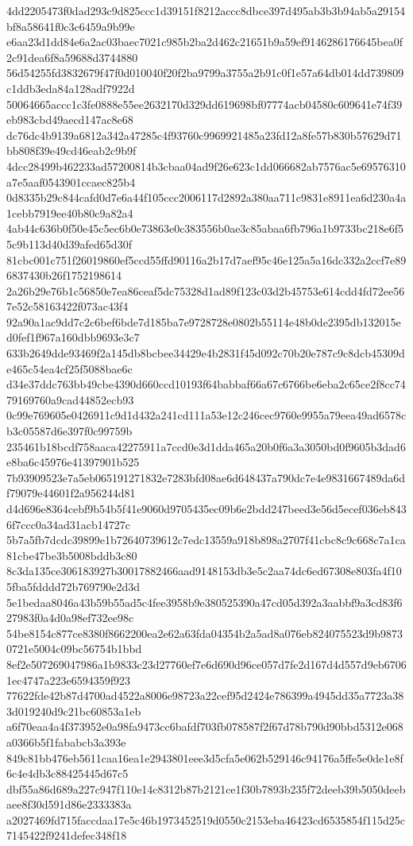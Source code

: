 {4dd2205473f0dad293c9d825ccc1d39151f8212accc8dbce397d495ab3b3b94ab5a29154bf8a58641f0c3c6459a9b99e
e6aa23d1dd84e6a2ac03baec7021c985b2ba2d462c21651b9a59ef9146286176645bea0f2c91dea6f8a59688d3744880
56d54255fd3832679f47f0d010040f20f2ba9799a3755a2b91c0f1e57a64db014dd739809c1ddb3eda84a128adf7922d
50064665accc1c3fe0888e55ee2632170d329dd619698bf07774acb04580c609641e74f39eb983cbd49aecd147ac8e68
dc76dc4b9139a6812a342a47285c4f93760c9969921485a23fd12a8fe57b830b57629d71bb808f39e49cd46eab2c9b9f
4dcc28499b462233ad57200814b3cbaa04ad9f26e623c1dd066682ab7576ac5e69576310a7e5aaf0543901ccaec825b4
0d8335b29c844cafd0d7e6a44f105ccc2006117d2892a380aa711c9831e8911ea6d230a4a1cebb7919ee40b80c9a82a4
4ab44c636b0f50e45c5ec6b0e73863e0c383556b0ae3c85abaa6fb796a1b9733bc218e6f55c9b113d40d39afed65d30f
81cbc001c751f26019860ef5ccd55ffd90116a2b17d7aef95c46e125a5a16dc332a2ccf7e896837430b26f1752198614
2a26b29e76b1c56850e7ea86ceaf5dc75328d1ad89f123c03d2b45753e614cdd4fd72ee567e52c58163422f073ac43f4
92a90a1ac9dd7c2c6bef6bde7d185ba7e9728728e0802b55114e48b0de2395db132015ed0fef1f967a160dbb9693e3c7
633b2649dde93469f2a145db8bcbee34429e4b2831f45d092c70b20e787c9c8dcb45309de465c54ea4cf25f5088bae6c
d34e37ddc763bb49cbe4390d660ccd10193f64babbaf66a67c6766be6eba2c65ce2f8cc7479169760a9cad44852ecb93
0c99e769605e0426911c9d1d432a241cd111a53e12c246cec9760e9955a79eea49ad6578cb3c05587d6e397f0c99759b
235461b18bcdf758aaca42275911a7ccd0e3d1dda465a20b0f6a3a3050bd0f9605b3dad6e8ba6c45976e41397901b525
7b93909523e7a5eb065191271832e7283bfd08ae6d648437a790dc7e4e9831667489da6df79079e44601f2a956244d81
d4d696e8364cebf9b54b5f41e9060d9705435ec09b6e2bdd247beed3e56d5ecef036eb8436f7ccc0a34ad31acb14727c
5b7a5fb7dcdc39899e1b72640739612c7edc13559a918b898a2707f41cbc8c9c668c7a1ca81cbe47be3b5008bddb3c80
8c3da135ce306183927b30017882466aad9148153db3e5c2aa74dc6ed67308e803fa4f105fba5fdddd72b769790e2d3d
5e1bedaa8046a43b59b55ad5c4fee3958b9e380525390a47cd05d392a3aabbf9a3cd83f627983f0a4d0a98ef732ee98c
54be8154c877ce8380f8662200ea2e62a63fda04354b2a5ad8a076eb824075523d9b98730721e5004c09bc56754b1bbd
8ef2e507269047986a1b9833c23d27760ef7e6d690d96ce057d7fe2d167d4d557d9eb67061ec4747a223e6594359f923
77622fde42b87d4700ad4522a8006e98723a22cef95d2424e786399a4945dd35a7723a383d019240d9c21bc60853a1eb
a6f70eaa4a4f373952e0a98fa9473cc6bafdf703fb078587f2f67d78b790d90bbd5312e068a0366b5f1fababcb3a393e
849c81bb476eb5611caa16ea1e2943801eee3d5cfa5e062b529146c94176a5ffe5e0de1e8f6c4e4db3c88425445d67c5
dbf55a86d689a227c947f110e14c8312b87b2121ce1f30b7893b235f72deeb39b5050deebaee8f30d591d86e2333383a
a2027469fd715faccdaa17e5c46b1973452519d0550c2153eba46423cd6535854f115d25c7145422f9241defec348f18
}
